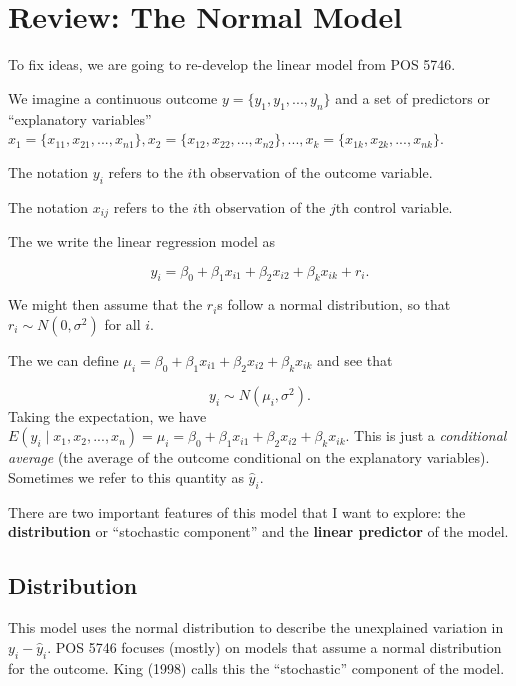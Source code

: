 \documentclass[
]{book}
\begin{document}
\hypertarget{review-the-normal-model}{%
\section{Review: The Normal Model}\label{review-the-normal-model}}

To fix ideas, we are going to re-develop the linear model from POS 5746.

We imagine a continuous outcome \(y = \{y_1, y_1,..., y_n\}\) and a set of predictors or ``explanatory variables'' \(x_1 = \{x_{11}, x_{21}, ..., x_{n1}\}, x_2 = \{x_{12}, x_{22}, ..., x_{n2}\}, ..., x_k = \{x_{1k}, x_{2k}, ..., x_{nk}\}\).

The notation \(y_i\) refers to the \(i\)th observation of the outcome variable.

The notation \(x_{ij}\) refers to the \(i\)th observation of the \(j\)th control variable.

The we write the linear regression model as

\[
y_i = \beta_0 + \beta_1 x_{i1} + \beta_2 x_{i2} + \beta_k x_{ik} + r_i.
\]

We might then assume that the \(r_i\)s follow a normal distribution, so that \(r_i \sim N(0, \sigma^2)\) for all \(i\).

The we can define \(\mu_i = \beta_0 + \beta_1 x_{i1} + \beta_2 x_{i2} + \beta_k x_{ik}\) and see that

\[
y_i \sim N(\mu_i, \sigma^2).
\]
Taking the expectation, we have \(E(y_i \mid x_1, x_2, ... , x_n) = \mu_i = \beta_0 + \beta_1 x_{i1} + \beta_2 x_{i2} + \beta_k x_{ik}\). This is just a \emph{conditional average} (the average of the outcome conditional on the explanatory variables). Sometimes we refer to this quantity as \(\hat{y}_i\).

There are two important features of this model that I want to explore: the \textbf{distribution} or ``stochastic component'' and the \textbf{linear predictor} of the model.

\hypertarget{distribution}{%
\subsection{Distribution}\label{distribution}}

This model uses the normal distribution to describe the unexplained variation in \(y_i - \hat{y}_i\). POS 5746 focuses (mostly) on models that assume a normal distribution for the outcome. King (1998) calls this the ``stochastic'' component of the model.
\end{document}
